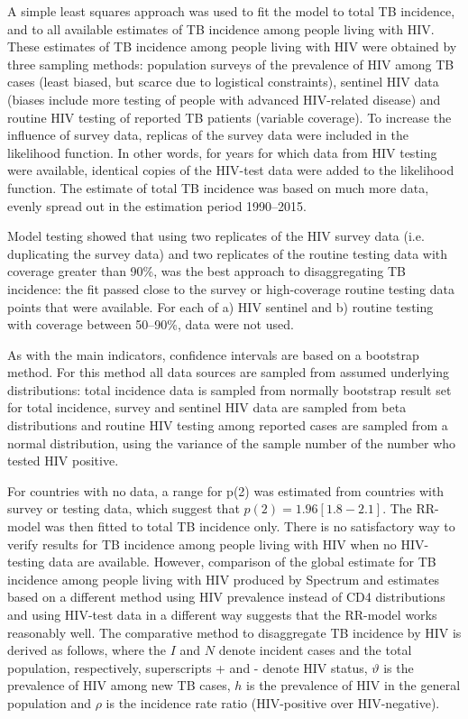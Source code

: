 A simple least squares approach was used to fit the model to total TB incidence, and to all available estimates of TB incidence among people living with HIV. These estimates of TB incidence among people living with HIV were obtained by three sampling methods: population surveys of the prevalence of HIV among TB cases (least biased, but scarce due to logistical constraints), sentinel HIV data (biases include more testing of people with advanced HIV-related disease) and routine HIV testing of reported TB patients (variable coverage). To increase the influence of survey data, replicas of the survey data were included in the likelihood function. In other words, for years for which data from HIV testing were available, identical copies of the HIV-test data were added to the likelihood function. The estimate of total TB incidence was based on much more data, evenly spread out in the estimation period 1990–2015.

Model testing showed that using two replicates of the HIV survey data (i.e. duplicating the survey data) and two replicates of the routine testing data with coverage greater than 90\%, was the best approach to disaggregating TB incidence: the fit passed close to the survey or high-coverage routine testing data points that were available. For each of a) HIV sentinel and b) routine testing with coverage between 50–90\%, data were not used.

As with the main indicators, confidence intervals are based on a bootstrap method. For this method all data sources are sampled from assumed underlying distributions: total incidence data is sampled from normally bootstrap result set for total incidence, survey and sentinel HIV data are sampled from beta distributions and routine HIV testing among reported cases are sampled from  a normal distribution, using the variance of the sample number of the number who tested HIV positive. 

For countries with no data, a range for p(2) was estimated from countries with survey or testing data, which suggest that $p(2) = 1.96 [1.8-2.1]$. The RR-model was then fitted to total TB incidence only. There is no satisfactory way to verify results for TB incidence among people living with HIV when no HIV-testing data are available. However, comparison of the global estimate for TB incidence among people living with HIV produced by Spectrum and estimates based on a different method using HIV prevalence instead of CD4 distributions and using  HIV-test data in a different way suggests that the RR-model works reasonably well. The comparative method to disaggregate TB incidence by HIV is derived as follows, where the $I$ and $N$ denote incident cases and the total population, respectively, superscripts + and - denote HIV status, $\vartheta$ is the prevalence of HIV among new TB cases, $h$ is the prevalence of HIV in the general population and $\rho$ is the incidence rate ratio (HIV-positive over HIV-negative).


